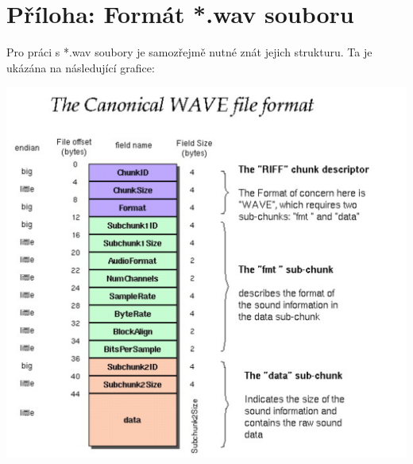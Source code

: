 \documentclass[11pt]{article} %
\begin{document}
\section*{Příloha: Formát *.wav souboru}
Pro práci s *.wav soubory je samozřejmě nutné znát jejich strukturu. Ta je ukázána na následující grafice\cite{wavspec}:
\begin{minipage}[c]{\textwidth}
\begin{center}
\includegraphics[scale=0.5]{wav-sound-format.pdf}
\end{center}
\end{minipage}
\renewcommand{\arraystretch}{1.2}
\end{document}
